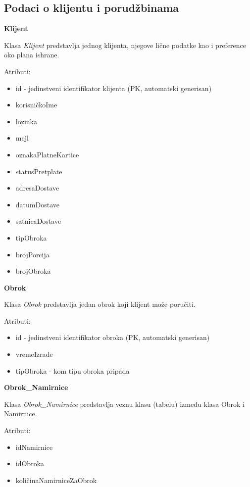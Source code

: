 \subsection{Podaci o klijentu i porudžbinama}

\textbf{\large Klijent}
\vspace{0.3cm}

Klasa \textit{Klijent} predstavlja jednog klijenta, njegove lične podatke kao i preference oko plana ishrane.

Atributi:
\begin{itemize}
    \item id - jedinstveni identifikator klijenta (PK, automatski generisan)
    \item korisničkoIme 
    \item lozinka
    \item mejl
    \item oznakaPlatneKartice
    \item statusPretplate
    \item adresaDostave
    \item datumDostave
    \item satnicaDostave
    \item tipObroka
    \item brojPorcija
    \item brojObroka
\end{itemize}

\textbf{\large Obrok}
\vspace{0.3cm}

Klasa \textit{Obrok} predstavlja jedan obrok koji klijent može poručiti.

Atributi:
\begin{itemize}
    \item id - jedinstveni identifikator obroka (PK, automatski generisan)
    \item vremeIzrade
    \item tipObroka - kom tipu obroka pripada
\end{itemize}

\textbf{\large Obrok\_Namirnice}
\vspace{0.3cm}

Klasa \textit{Obrok\_Namirnice} predstavlja veznu klasu (tabelu) između klasa Obrok i Namirnice.

Atributi:
\begin{itemize}
    \item idNamirnice
    \item idObroka
    \item količinaNamirniceZaObrok
\end{itemize}

